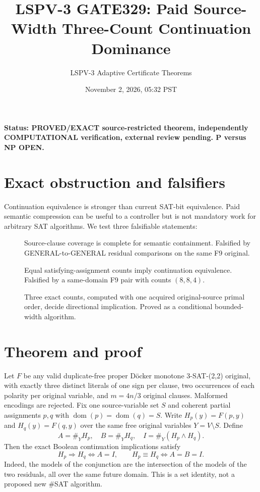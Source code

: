 \documentclass[11pt]{article}
\title{LSPV-3 GATE329: Paid Source-Width Three-Count Continuation Dominance}
\author{LSPV-3 Adaptive Certificate Theorems}
\date{November 2, 2026, 05:32 PST}
\begin{document}
\maketitle
\noindent\textbf{Status: PROVED/EXACT source-restricted theorem, independently COMPUTATIONAL verification, external review pending. P versus NP OPEN.}
\section{Exact obstruction and falsifiers}
Continuation equivalence is stronger than current SAT-bit equivalence. Paid semantic compression can be useful to a controller but is not mandatory work for arbitrary SAT algorithms. We test three falsifiable statements:
\begin{description}
\item[] Source-clause coverage is complete for semantic containment. Falsified by GENERAL-to-GENERAL residual comparisons on the same F9 original.
\item[] Equal satisfying-assignment counts imply continuation equivalence. Falsified by a same-domain F9 pair with counts $(8,8,4)$.
\item[] Three exact counts, computed with one acquired original-source primal order, decide directional implication. Proved as a conditional bounded-width algorithm.
\end{description}
\section{Theorem and proof}
Let $F$ be any valid duplicate-free proper D\"ocker monotone 3-SAT-(2,2) original, with exactly three distinct literals of one sign per clause, two occurrences of each polarity per original variable, and $m=4n/3$ original clauses. Malformed encodings are rejected. Fix one source-variable set $S$ and coherent partial assignments $p,q$ with $\operatorname{dom}(p)=\operatorname{dom}(q)=S$. Write $H_p(y)=F(p,y)$ and $H_q(y)=F(q,y)$ over the same free original variables $Y=V\setminus S$. Define
\[
 A=\#_Y H_p,\quad B=\#_Y H_q,\quad I=\#_Y(H_p\wedge H_q).
\]
Then the exact Boolean continuation implications satisfy
\[
 \boxed{H_p\Rightarrow H_q\iff A=I,\qquad H_p\equiv H_q\iff A=B=I.}
\]
Indeed, the models of the conjunction are the intersection of the models of the two residuals, all over the same future domain. This is a set identity, not a proposed new #SAT algorithm.
\end{document}
